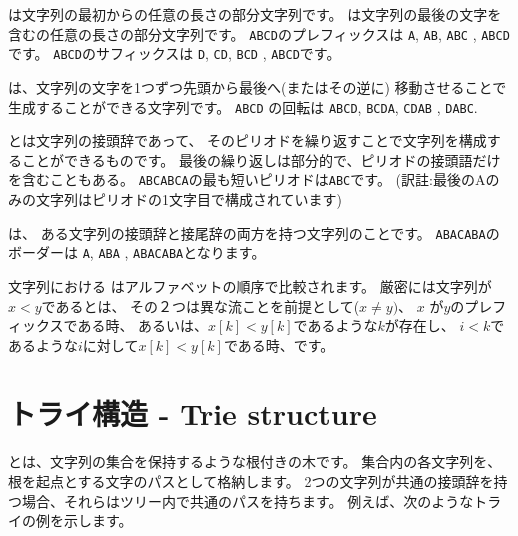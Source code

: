 
は文字列の最初からの任意の長さの部分文字列です。
 は文字列の最後の文字を含むの任意の長さの部分文字列です。
\texttt{ABCD}のプレフィックスは
\texttt{A}, \texttt{AB}, \texttt{ABC} , \texttt{ABCD}です。
\texttt{ABCD}のサフィックスは
\texttt{D}, \texttt{CD}, \texttt{BCD} , \texttt{ABCD}です。


 は、文字列の文字を1つずつ先頭から最後へ(またはその逆に)
移動させることで生成することができる文字列です。
\texttt{ABCD} の回転は
\texttt{ABCD}, \texttt{BCDA}, \texttt{CDAB} , \texttt{DABC}.


 とは文字列の接頭辞であって、
そのピリオドを繰り返すことで文字列を構成することができるものです。
最後の繰り返しは部分的で、ピリオドの接頭語だけを含むこともある。
\texttt{ABCABCA}の最も短いピリオドは\texttt{ABC}です。
(訳註:最後のAのみの文字列はピリオドの1文字目で構成されています)


 は、
ある文字列の接頭辞と接尾辞の両方を持つ文字列のことです。
\texttt{ABACABA}のボーダーは
\texttt{A}, \texttt{ABA} , \texttt{ABACABA}となります。


文字列における
はアルファベットの順序で比較されます。
厳密には文字列が$x<y$であるとは、
その２つは異な流ことを前提として($x \neq y)$、
$x$ が$y$のプレフィックスである時、
あるいは、$x[k]<y[k]$であるような$k$が存在し、
$i<k$であるような$i$に対して$x[k]<y[k]$である時、です。

\section{トライ構造 - Trie structure}


 とは、文字列の集合を保持するような根付きの木です。
集合内の各文字列を、根を起点とする文字のパスとして格納します。
2つの文字列が共通の接頭辞を持つ場合、それらはツリー内で共通のパスを持ちます。
例えば、次のようなトライの例を示します。

